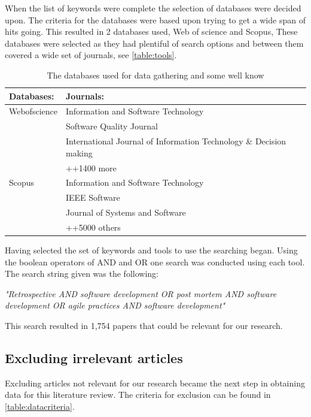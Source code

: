 \documentclass[12pt]{article}
\begin{document}
When the list of keywords were complete the selection of databases were decided upon. The criteria for the databases were based upon trying to get a wide span of hits going. This resulted in 2 databases used, Web of science and Scopus, These databases were selected as they had plentiful of search options and between them covered a wide set of journals, see \autoref{table:tools}. 

\begin{table}[!h]
	\begin{center}
		\caption{The databases used for data gathering and some well know}
		\label{table:tools}
		\begin{tabular}{ l | p{}}
			Databases: & Journals: \\ \hline
			Webofscience & Information and Software Technology \\ 
			& Software Quality Journal \\
			& International Journal of Information Technology \& Decision making \\
			& ++1400 more \\
			\hline
			Scopus & Information and Software Technology \\ 
			& IEEE Software\\
			& Journal of Systems and Software \\
			& ++5000 others \\
		\end{tabular}
	\end{center}
\end{table}
			
Having selected the set of keywords and tools to use the searching began. Using the boolean operators of AND and OR one search was conducted using each tool. The search string given was the following: 
\begin{center}
	\emph{"Retrospective AND software development OR post mortem AND software development OR agile practices AND software development"}
\end{center}
This search resulted in 1,754 papers that could be relevant for our research.

\subsection{Excluding irrelevant articles}
Excluding articles not relevant for our research became the next step in obtaining data for this literature review. The criteria for exclusion can be found in \autoref{table:datacriteria}. \\
\end{document}
